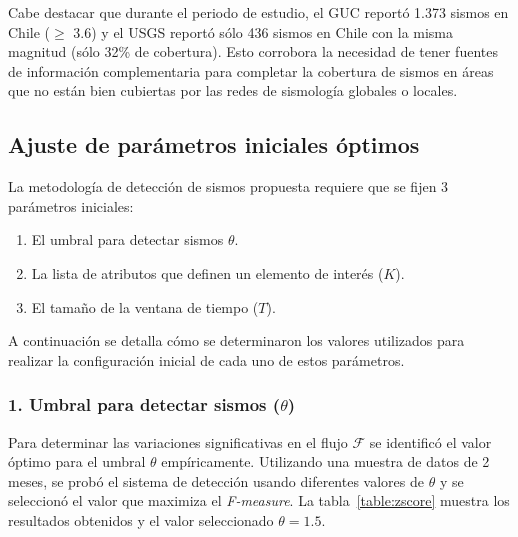 		Cabe destacar que durante el periodo de estudio, el GUC reportó 1.373 sismos en Chile ($\geq$ $3.6$) y el USGS reportó sólo 436 sismos en Chile con la misma magnitud (sólo 32\% de cobertura). Esto corrobora la necesidad de tener fuentes de información complementaria para completar la cobertura de sismos en áreas que no están bien cubiertas por las redes de sismología globales o locales. 
		
	\subsection{Ajuste de parámetros iniciales óptimos}

	La metodología de detección de sismos propuesta requiere que se fijen 3 parámetros iniciales:
	\begin{enumerate}
		\item El umbral para detectar sismos $\theta$.
		\item La lista de atributos que definen un elemento de interés ($K$).
		\item El tamaño de la ventana de tiempo ($T$).
	\end{enumerate}
	
	A continuación se detalla cómo se determinaron los valores utilizados para realizar la configuración inicial de cada uno de estos parámetros. 

	\subsubsection*{1. Umbral para detectar sismos ($\theta$)}
	Para determinar las variaciones significativas en el flujo $\mathcal{F}$ se identificó el valor óptimo para el umbral $\theta$ empíricamente. 
	Utilizando una muestra de datos de 2 meses, se probó el sistema de detección usando diferentes valores de $\theta$ y se seleccionó el valor que maximiza el {\em F-measure}.
	La tabla~\ref{table:zscore} muestra los resultados obtenidos y el valor seleccionado $\theta=1.5$.
	


